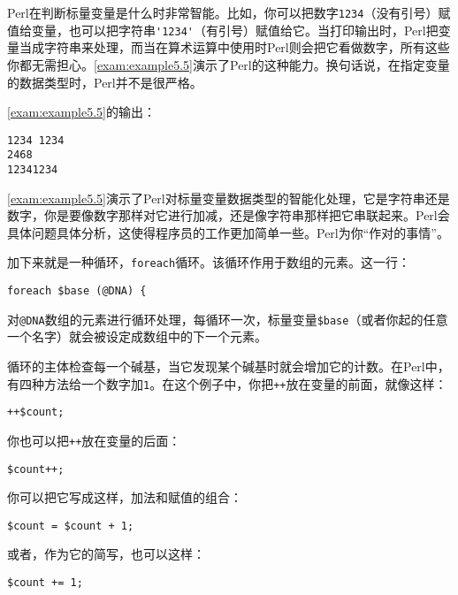 Perl在判断标量变量是什么时非常智能。比如，你可以把数字\verb|1234|（没有引号）赋值给变量，也可以把字符串\verb|'1234'|（有引号）赋值给它。当打印输出时，Perl把变量当成字符串来处理，而当在算术运算中使用时Perl则会把它看做数字，所有这些你都无需担心。\autoref{exam:example5.5}演示了Perl的这种能力。换句话说，在指定变量的数据类型时，Perl并不是很严格。



\autoref{exam:example5.5}的输出：

\begin{lstlisting}
1234 1234
2468
12341234
\end{lstlisting}

\autoref{exam:example5.5}演示了Perl对标量变量数据类型的智能化处理，它是字符串还是数字，你是要像数字那样对它进行加减，还是像字符串那样把它串联起来。Perl会具体问题具体分析，这使得程序员的工作更加简单一些。Perl为你“作对的事情”。

加下来就是一种循环，\verb|foreach|循环。该循环作用于数组的元素。这一行：

\begin{lstlisting}
foreach $base (@DNA) {
\end{lstlisting}

对\verb|@DNA|数组的元素进行循环处理，每循环一次，标量变量\verb|$base|（或者你起的任意一个名字）就会被设定成数组中的下一个元素。

循环的主体检查每一个碱基，当它发现某个碱基时就会增加它的计数。在Perl中，有四种方法给一个数字加\verb|1|。在这个例子中，你把\verb|++|放在变量的前面，就像这样：

\begin{lstlisting}
++$count; 
\end{lstlisting}

你也可以把\verb|++|放在变量的后面：

\begin{lstlisting}
$count++;
\end{lstlisting}

你可以把它写成这样，加法和赋值的组合：

\begin{lstlisting}
$count = $count + 1;
\end{lstlisting}

或者，作为它的简写，也可以这样：

\begin{lstlisting}
$count += 1;
\end{lstlisting}

